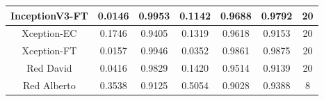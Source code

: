 \documentclass[11pt,a4paper]{article}
\theoremstyle{definition}
\begin{document}
\begin{table}[H]
\begin{tabular}{|c|c|c|c|c|c|c|}
\hline
InceptionV3-FT                                      & \textcolor[rgb]{0.129,0.129,0.129}{0.0146 } & \textcolor[rgb]{0.129,0.129,0.129}{0.9953 } & \textcolor[rgb]{0.129,0.129,0.129}{0.1142 }                                                                       & \textcolor[rgb]{0.129,0.129,0.129}{0.9688}                                                                             & \textcolor[rgb]{0.129,0.129,0.129}{0.9792}                                                                       & 20                                                                                                              \\
\hline
Xception-EC                                            & \textcolor[rgb]{0.129,0.129,0.129}{0.1746 } & \textcolor[rgb]{0.129,0.129,0.129}{0.9405 } & \textcolor[rgb]{0.129,0.129,0.129}{0.1319 }                                                                       & \textcolor[rgb]{0.129,0.129,0.129}{0.9618}                                                                             & \textcolor[rgb]{0.129,0.129,0.129}{0.9153}                                                                       & 20                                                                                                              \\
\hline
Xception-FT                        & \textcolor[rgb]{0.129,0.129,0.129}{0.0157 } & \textcolor[rgb]{0.129,0.129,0.129}{0.9946 } & \textcolor[rgb]{0.129,0.129,0.129}{0.0352 }                                                                       & \textcolor[rgb]{0.129,0.129,0.129}{0.9861}                                                                             & \textcolor[rgb]{0.129,0.129,0.129}{0.9875}                                                                       & 20                                                                                                              \\
\hline
Red David                        & \textcolor[rgb]{0.129,0.129,0.129}{0.0416 } & \textcolor[rgb]{0.129,0.129,0.129}{0.9829 } & \textcolor[rgb]{0.129,0.129,0.129}{0.1420 }                                                                       & \textcolor[rgb]{0.129,0.129,0.129}{0.9514 }                                                                             & \textcolor[rgb]{0.129,0.129,0.129}{0.9139}                                                                      
& 20
\\
\hline
\rowcolor{green} Red Alberto                        & \textcolor[rgb]{0.129,0.129,0.129}{0.3538  } & \textcolor[rgb]{0.129,0.129,0.129}{0.9125  } & \textcolor[rgb]{0.129,0.129,0.129}{0.5054}                                                                       & \textcolor[rgb]{0.129,0.129,0.129}{0.9028}                                                                             & \textcolor[rgb]{0.129,0.129,0.129}{0.9388}                                                                       & 8                                                                                                              \\
\hline


\end{tabular}
\end{table}
\end{document}
